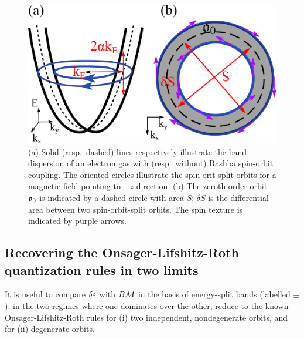 \documentclass[aps, prb, showpacs, twocolumn, notitlepage, superscriptaddress]{revtex4-1}
\begin{document}
\begin{figure}
\includegraphics[width=0.9\columnwidth]{orbits.png}
\caption{(a) Solid (resp.\ dashed) lines respectively illustrate the band dispersion of an electron gas with (resp.\ without) Rashba spin-orbit coupling.  The oriented circles illustrate the spin-orit-split orbits for a magnetic field pointing to $-z$ direction. (b) The zeroth-order orbit $\mathfrak{o}_0$ is indicated by a dashed circle with area $S$; $\delta S$ is the differential area  between two spin-orbit-split orbits. The spin texture is indicated by purple arrows.\label{fig:orbits}}
\end{figure}


\subsection{Recovering the Onsager-Lifshitz-Roth quantization rules in two limits}\label{sec:recoveronsager}

It is useful to compare $\delta \varepsilon$ with $B{\cal M}$ in the basis of energy-split bands (labelled $\pm$): in the two regimes where one dominates over the other,  reduce to the known Onsager-Lifshitz-Roth rules for (i) two independent, nondegenerate orbits, and for (ii) degenerate orbits.  \\

\end{document}

